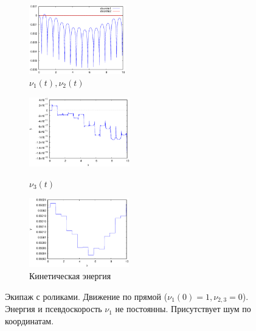 \begin{figure}
    \begin{subfigure}[t]{0.3\textwidth}
        \centering
        \includegraphics[width=\linewidth, height=30mm]{pic/_sol__1_0_0__0__10__1e2_nu12_centered}
        \caption{$\nu_1(t), \nu_2(t)$}
        \label{fig:_sol__1_0_0__0__10__1e2_nu12_centered}    
    \end{subfigure}
    \hfill
    \begin{subfigure}[t]{0.3\textwidth}
        \centering
        \includegraphics[width=\linewidth, height=30mm]{pic/_sol__1_0_0__0__10__1e2_nu3} \\
        \caption{$\nu_3(t)$}
        \label{fig:_sol__1_0_0__0__10__1e2_nu3}
    \end{subfigure}
    \hfill
    \begin{subfigure}[t]{0.3\textwidth}
        \centering
        \includegraphics[width=\linewidth, height=30mm]{pic/_sol__1_0_0__0__10__1e2_kin_en}
        \caption{Кинетическая энергия}
        \label{fig:_sol__1_0_0__0__10__1e2_kin_en}
    \end{subfigure}
    
    \caption{Экипаж с роликами. Движение по прямой ($\nu_1(0) = 1, \nu_{2,3} = 0$). Энергия и псевдоскорость $\nu_1$ не постоянны. Присутствует шум по координатам.}
    \label{fig:straight}
\end{figure}
